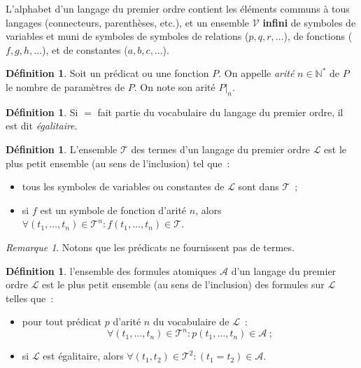\documentclass{article}
\theoremstyle{definition}
\newtheorem{déf}[thm]{Définition}
\theoremstyle{remark}
\newtheorem*{rmq}{Remarque}
\newcommand{\N}{\mathbb N}
\begin{document}
	L'alphabet d'un langage du premier ordre contient les éléments communs à tous langages (connecteurs, parenthèses, etc.), et un ensemble $\mathcal V$
	\textbf{infini} de symboles de variables et muni de symboles de symboles de relations ($p, q, r, \ldots$), de fonctions ($f, g, h, \ldots$), et de
	constantes ($a, b, c, \ldots$).

	\begin{déf} Soit un prédicat ou une fonction $P$. On appelle \textit{arité} $n \in \N^*$ de $P$ le nombre de paramètres de $P$. On note son arité $P|_n$.
	\end{déf}

	\begin{déf} Si $=$ fait partie du vocabulaire du langage du premier ordre, il est dit \textit{égalitaire}.
	\end{déf}

	\begin{déf} L'ensemble $\mathcal T$ des termes d'un langage du premier ordre $\mathcal L$ est le plus petit ensemble (au sens de l'inclusion) tel que~:
	\begin{itemize}
		\item tous les symboles de variables ou constantes de $\mathcal L$ sont dans $\mathcal T$~;
		\item si $f$ est un symbole de fonction d'arité $n$, alors $\forall (t_1, \ldots, t_n) \in \mathcal T^n : f(t_1, \ldots, t_n) \in \mathcal T$.
	\end{itemize}
	\end{déf}

	\begin{rmq} Notons que les prédicats ne fournissent pas de termes.
	\end{rmq}

	\begin{déf} l'ensemble des formules atomiques $\mathcal A$ d'un langage du premier ordre $\mathcal L$ est le plus petit ensemble (au sens de l'inclusion)
	des formules sur $\mathcal L$ telles que~:
	\begin{itemize}
		\item pour tout prédicat $p$ d'arité $n$ du vocabulaire de $\mathcal L$~:
		\[\forall (t_1, \ldots, t_n) \in \mathcal T^n : p(t_1, \ldots, t_n) \in \mathcal A~;\]
		\item si $\mathcal L$ est égalitaire, alors $\forall (t_1, t_2) \in \mathcal T^2 : (t_1=t_2) \in \mathcal A$.
	\end{itemize}
	\end{déf}
\end{document}
